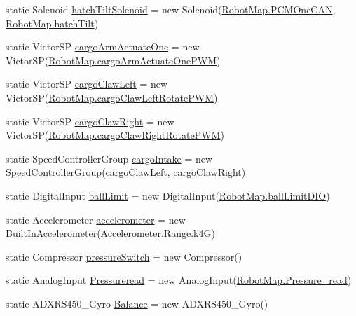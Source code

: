 \begin{DoxyCompactItemize}
\item 
static Solenoid \hyperlink{classfrc_1_1robot_1_1OI_aa8cdb6b236dfb9fead12621b4f42c274}{hatch\+Tilt\+Solenoid} = new Solenoid(\hyperlink{classfrc_1_1robot_1_1RobotMap_a79a848df56d706c787d9a4f9a0434e7f}{Robot\+Map.\+P\+C\+M\+One\+C\+AN}, \hyperlink{classfrc_1_1robot_1_1RobotMap_a0c656cb43ea0fd37d6b94991e8473bf9}{Robot\+Map.\+hatch\+Tilt})
\item 
static Victor\+SP \hyperlink{classfrc_1_1robot_1_1OI_aeee9fe6efef4ea8f2558ccd2de43e71a}{cargo\+Arm\+Actuate\+One} = new Victor\+SP(\hyperlink{classfrc_1_1robot_1_1RobotMap_aaff9d0adef8e1f97db2ac47f985f044a}{Robot\+Map.\+cargo\+Arm\+Actuate\+One\+P\+WM})
\item 
static Victor\+SP \hyperlink{classfrc_1_1robot_1_1OI_a7ec725773fd1bb5dc4263980a232e75f}{cargo\+Claw\+Left} = new Victor\+SP(\hyperlink{classfrc_1_1robot_1_1RobotMap_aa5824f279bf68bbd68ae1ea3087c4b67}{Robot\+Map.\+cargo\+Claw\+Left\+Rotate\+P\+WM})
\item 
static Victor\+SP \hyperlink{classfrc_1_1robot_1_1OI_a32fd81c9a712924aa42a9eb74f278df1}{cargo\+Claw\+Right} = new Victor\+SP(\hyperlink{classfrc_1_1robot_1_1RobotMap_a108c3b97c541e7ed5a152cea66981231}{Robot\+Map.\+cargo\+Claw\+Right\+Rotate\+P\+WM})
\item 
static Speed\+Controller\+Group \hyperlink{classfrc_1_1robot_1_1OI_a40d2adcc988805032885ba668fc6f86f}{cargo\+Intake} = new Speed\+Controller\+Group(\hyperlink{classfrc_1_1robot_1_1OI_a7ec725773fd1bb5dc4263980a232e75f}{cargo\+Claw\+Left}, \hyperlink{classfrc_1_1robot_1_1OI_a32fd81c9a712924aa42a9eb74f278df1}{cargo\+Claw\+Right})
\item 
static Digital\+Input \hyperlink{classfrc_1_1robot_1_1OI_aebf7c01734a48f269b40f7b1f1125f10}{ball\+Limit} = new Digital\+Input(\hyperlink{classfrc_1_1robot_1_1RobotMap_a83f3eec03443af1dbe44492871796c92}{Robot\+Map.\+ball\+Limit\+D\+IO})
\item 
static Accelerometer \hyperlink{classfrc_1_1robot_1_1OI_a57e609e018f3013d5beb8bffa5771df0}{accelerometer} = new Built\+In\+Accelerometer(Accelerometer.\+Range.\+k4G)
\item 
static Compressor \hyperlink{classfrc_1_1robot_1_1OI_a68157a4a30cc0fae8bc36ae0ac999c82}{pressure\+Switch} = new Compressor()
\item 
static Analog\+Input \hyperlink{classfrc_1_1robot_1_1OI_a763d5acad9b29d4b29b0fff838059571}{Pressureread} = new Analog\+Input(\hyperlink{classfrc_1_1robot_1_1RobotMap_a10cc39db919c29133e2bc774281804b0}{Robot\+Map.\+Pressure\+\_\+read})
\item 
static A\+D\+X\+R\+S450\+\_\+\+Gyro \hyperlink{classfrc_1_1robot_1_1OI_a951d7ff102fca8319e5a9401a0f2214b}{Balance} = new A\+D\+X\+R\+S450\+\_\+\+Gyro()
\end{DoxyCompactItemize}



